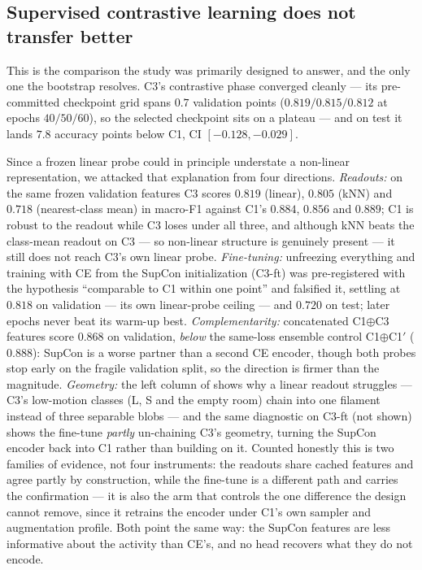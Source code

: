 \subsection{Supervised contrastive learning does not transfer better}
\label{sec:res_supcon}

This is the comparison the study was primarily designed to answer, and the
only one the bootstrap resolves. C3's contrastive phase converged cleanly ---
its pre-committed checkpoint grid spans $0.7$ validation points
($0.819/0.815/0.812$ at epochs $40/50/60$), so the selected checkpoint sits on
a plateau --- and on test it lands $7.8$ accuracy points below C1, CI
$[-0.128,-0.029]$.

Since a frozen linear probe could in principle understate a non-linear
representation, we attacked that explanation from four directions.
\emph{Readouts:} on the same frozen validation features C3 scores $0.819$
(linear), $0.805$ (kNN) and $0.718$ (nearest-class mean) in macro-F1 against
C1's $0.884$, $0.856$ and $0.889$; C1 is robust to the readout while C3 loses
under all three, and although kNN beats the class-mean readout on C3 --- so
non-linear structure is genuinely present --- it still does not reach C3's own
linear probe. \emph{Fine-tuning:} unfreezing everything and training with CE
from the SupCon initialization (C3-ft) was pre-registered with the hypothesis
``comparable to C1 within one point'' and falsified it, settling at $0.818$ on
validation --- its own linear-probe ceiling --- and $0.720$ on test; later epochs never beat its warm-up best.
\emph{Complementarity:} concatenated C1$\oplus$C3 features score $0.868$ on
validation, \emph{below} the same-loss ensemble control C1$\oplus$C1$'$
($0.888$): SupCon is a worse partner than a second CE encoder, though both
probes stop early on the fragile validation split, so the direction is firmer
than the magnitude.
\emph{Geometry:} the left column of  shows why a linear readout
struggles --- C3's low-motion classes (L, S and the empty room) chain into one
filament instead of three separable blobs --- and the same diagnostic on C3-ft
(not shown) shows the fine-tune \emph{partly} un-chaining C3's geometry, turning the
SupCon encoder back into C1 rather than building on it. Counted honestly this
is two families of evidence,
not four instruments: the readouts share cached features and agree partly by
construction, while the fine-tune is a different path and carries the
confirmation --- it is also the arm that controls the one difference the design
cannot remove, since it retrains the encoder under C1's own sampler and
augmentation profile. Both point the same way: the SupCon features are less
informative about the activity than CE's, and no head recovers what they do
not encode.

